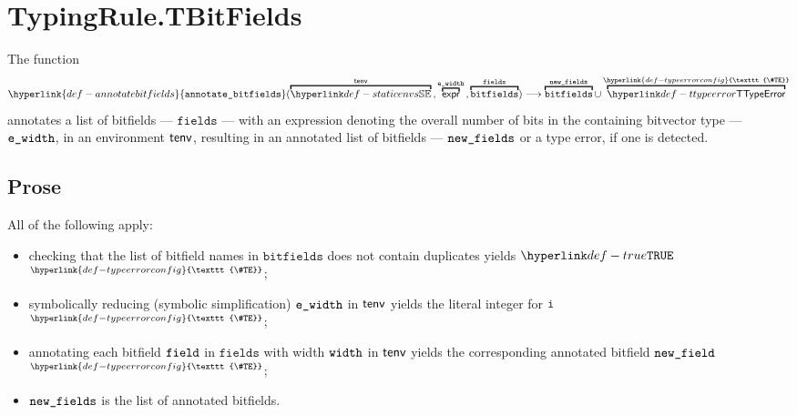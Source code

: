 \documentclass{book}
\newcommand\TypeErrorConfig[0]{\hyperlink{def-typeerrorconfig}{\texttt{\#TE}}}
\newcommand\ProseOrTypeError[0]{\hyperlink{def-proseortypeerror}{$^{\TypeErrorConfig}$}}
\newcommand\annotatebitfields[0]{\hyperlink{def-annotatebitfields}{\texttt{annotate\_bitfields}}}
\newcommand\bitfields[0]{\texttt{bitfields}}
\newcommand\fields[0]{\texttt{fields}}
\begin{document}

\section{TypingRule.TBitFields \label{sec:TypingRule.TBitFields}}
\hypertarget{def-annotatebitfields}{}
The function
\[
  \annotatebitfields(\overname{\staticenvs}{\tenv} \aslsep \overname{\expr}{\ewidth} \aslsep \overname{\bitfields}{\fields})
  \aslto \overname{\bitfields}{\newfields} \cup \overname{\TTypeError}{\TypeErrorConfig}
\]
annotates a list of bitfields --- $\fields$ --- with an expression denoting the overall number of bits in the containing
bitvector type --- $\texttt{e\_width}$,
in an environment $\textsf{tenv}$, resulting in an
annotated list of bitfields --- $\texttt{new\_fields}$ or a type error, if one is detected.

\subsection{Prose}
All of the following apply:
\begin{itemize}
  \item checking that the list of bitfield names in $\bitfields$ does not contain duplicates yields $\True$ \ProseOrTypeError;
  \item symbolically reducing (symbolic simplification) $\texttt{e\_width}$ in $\textsf{tenv}$ yields the literal integer for $\texttt{i}$ \ProseOrTypeError;
  \item annotating each bitfield $\texttt{field}$ in $\fields$ with width $\texttt{width}$ in $\textsf{tenv}$ yields the corresponding annotated
  bitfield $\texttt{new\_field}$ \ProseOrTypeError;
  \item $\texttt{new\_fields}$ is the list of annotated bitfields.
\end{itemize}


\end{document}
